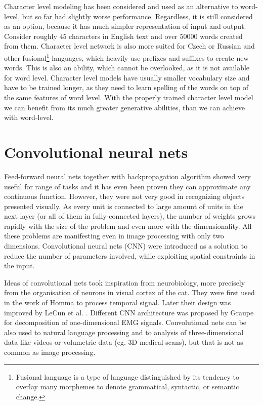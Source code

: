 
Character level modeling has been considered and used as an alternative to word-level, but so far had slightly worse performance. Regardless, it is still considered as an option, because it has much simpler representation of input and output. Consider roughly $ 45 $ characters in English text and over $ 50 000 $ words created from them. Character level network is also more suited for Czech or Russian and other fusional\footnote{Fusional language is a type of language distinguished by its tendency to overlay many morphemes to denote grammatical, syntactic, or semantic change.} languages, which heavily use prefixes and suffixes to create new words. This is also an ability, which cannot be overlooked, as it is not available for word level.
Character level models have usually smaller vocabulary size and have to be trained longer, as they need to learn spelling of the words on top of the same features of word level. With the properly trained character level model we can benefit from its much greater generative abilities, than we can achieve with word-level.

	\section{Convolutional neural nets}
	
Feed-forward neural nets together with backpropagation algorithm showed very useful for range of tasks and it has even been proven\cite{cybenko:mcss,journals/nn/Hornik91} they can approximate any continuous function. However, they were not very good in recognizing objects presented visually. As every unit is connected to large amount of units in the next layer (or all of them in fully-connected layers), the number of weights grows rapidly with the size of the problem and even more with the dimensionality. All these problems are manifesting even in image processing with only two dimensions. Convolutional neural nets (CNN) were introduced as a solution to reduce the number of parameters involved, while exploiting spatial constraints in the input.

Ideas of convolutional nets took inspiration from neurobiology, more precisely from the organisation of neurons in visual cortex of the cat. They were first used in the work of Homma\cite{NIPS1987_20} to process temporal signal. Later their design was improved by LeCun et al. \cite{lecun-98}. Different CNN architecture was proposed by Graupe\cite{graupe1988} for decomposition of one-dimensional EMG signals. Convolutional nets can be also used to natural language processing\cite{DBLP:journals/corr/Kim14f} and to analysis of three-dimensional data like videos\cite{10.1109/TPAMI.2012.59} or volumetric data (eg. 3D medical scans), but that is not as common as image processing.

